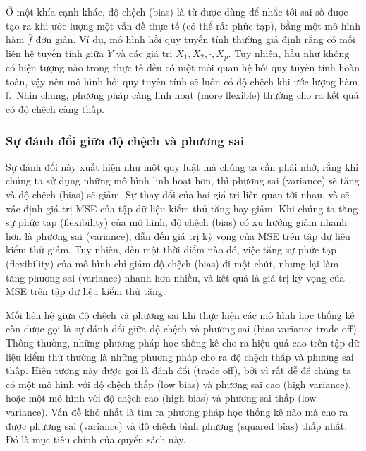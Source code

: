 \documentclass[
]{article}
\begin{document}
Ở một khía cạnh khác, độ chệch (bias) là từ được dùng để nhắc tới sai số được tạo ra khi ước lượng một vấn đề thực tế (có thể rất phức tạp), bằng một mô hình hàm \(\hat{f}\) đơn giản. Ví dụ, mô hình hồi quy tuyến tính thường giả định rằng có mối liên hệ tuyến tính giữa \(Y\) và các giá trị \(X_1, X_2, \cdot, X_p\). Tuy nhiên, hầu như không có hiện tượng nào trong thực tế đều có một mối quan hệ hồi quy tuyến tính hoàn toàn, vậy nên mô hình hồi quy tuyến tính sẽ luôn có độ chệch khi ước lượng hàm f.~Nhìn chung, phương pháp càng linh hoạt (more flexible) thường cho ra kết quả có độ chệch càng thấp.

\hypertarget{sux1ef1-ux111uxe1nh-ux111ux1ed5i-giux1eefa-ux111ux1ed9-chux1ec7ch-vuxe0-phux1b0ux1a1ng-sai-1}{%
\subsubsection{Sự đánh đổi giữa độ chệch và phương sai}\label{sux1ef1-ux111uxe1nh-ux111ux1ed5i-giux1eefa-ux111ux1ed9-chux1ec7ch-vuxe0-phux1b0ux1a1ng-sai-1}}

Sự đánh đổi này xuất hiện như một quy luật mà chúng ta cần phải nhớ, rằng khi chúng ta sử dụng những mô hình linh hoạt hơn, thì phương sai (variance) sẽ tăng và độ chệch (bias) sẽ giảm. Sự thay đổi của hai giá trị liên quan tới nhau, và sẽ xác định giá trị MSE của tập dữ liệu kiểm thử tăng hay giảm. Khi chúng ta tăng sự phức tạp (flexibility) của mô hình, độ chệch (bias) có xu hướng giảm nhanh hơn là phương sai (variance), dẫn đến giá trị kỳ vọng của MSE trên tập dữ liệu kiểm thử giảm. Tuy nhiên, đến một thời điểm nào đó, việc tăng sự phức tạp (flexibility) của mô hình chỉ giảm độ chệch (bias) đi một chút, nhưng lại làm tăng phương sai (variance) nhanh hơn nhiều, và kết quả là giá trị kỳ vọng của MSE trên tập dữ liệu kiểm thử tăng.

Mối liên hệ giữa độ chệch và phương sai khi thực hiện các mô hình học thống kê còn được gọi là sự đánh đổi giữa độ chệch và phương sai (bias-variance trade off). Thông thường, những phương pháp học thống kê cho ra hiệu quả cao trên tập dữ liệu kiểm thử thường là những phương pháp cho ra độ chệch thấp và phương sai thấp. Hiện tượng này được gọi là đánh đổi (trade off), bởi vì rất dễ để chúng ta có một mô hình với độ chệch thấp (low bias) và phương sai cao (high variance), hoặc một mô hình với độ chệch cao (high bias) và phương sai thấp (low variance). Vấn đề khó nhất là tìm ra phương pháp học thống kê nào mà cho ra được phương sai (variance) và độ chệch bình phương (squared bias) thấp nhất. Đó là mục tiêu chính của quyển sách này.
\end{document}
